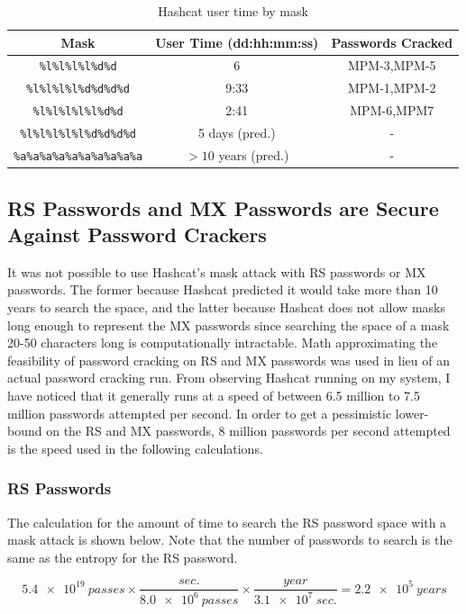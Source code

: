 \documentclass{article}
\begin{document}
\begin{table}
\begin{tabular}{|c|c|c|}
\hline
Mask & User Time (dd:hh:mm:ss) & Passwords Cracked \\
\hline
\texttt{\%l\%l\%l\%l\%d\%d} & 6 & MPM-3,MPM-5 \\
\hline
\texttt{\%l\%l\%l\%l\%d\%d\%d\%d} & 9:33 & MPM-1,MPM-2 \\
\hline
\texttt{\%l\%l\%l\%l\%l\%d\%d} & 2:41 & MPM-6,MPM7\\
\hline
\texttt{\%l\%l\%l\%l\%l\%d\%d\%d\%d} & 5 days (pred.) & - \\
\hline
\texttt{\%a\%a\%a\%a\%a\%a\%a\%a\%a\%a} & $> 10$ years (pred.) & - \\
\hline
\end{tabular}
\caption{Hashcat user time by mask}
\end{table}

\subsection*{RS Passwords and MX Passwords are Secure Against Password Crackers}
It was not possible to use Hashcat's mask attack with RS passwords or MX passwords. The former because Hashcat predicted it would take more than 10 years to search the space, and the latter because Hashcat does not allow masks long enough to represent the MX passwords since searching the space of a mask 20-50 characters long is computationally intractable. Math approximating the feasibility of password cracking on RS and MX passwords was used in lieu of an actual password cracking run. From observing Hashcat running on my system, I have noticed that it generally runs at a speed of between 6.5 million to 7.5 million passwords attempted per second. In order to get a pessimistic lower-bound on the RS and MX passwords, 8 million passwords per second attempted is the speed used in the following calculations. 

\subsubsection*{RS Passwords}
The calculation for the amount of time to search the RS password space with a mask attack is shown below. Note that the number of passwords to search is the same as the entropy for the RS password.

$$\num{5.4e19}~passes \times \frac{sec.}{\num{8.0e6}~passes} \times \frac{year}{\num{3.1e7}~sec.} = \num{2.2e5}~years$$
\end{document}
